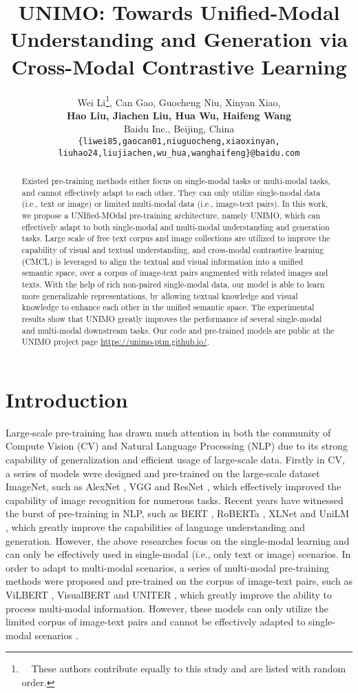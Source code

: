 \documentclass[11pt,a4paper]{article}
\title{UNIMO: Towards Unified-Modal Understanding and Generation via Cross-Modal Contrastive Learning}
\author{Wei Li\thanks{\ \ These authors contribute equally to this study and are listed with random order.}, Can Gao\footnotemark[1], Guocheng Niu\footnotemark[1],  Xinyan Xiao\footnotemark[1], \\ \textbf{Hao Liu, Jiachen Liu, Hua Wu, Haifeng Wang} \\
  Baidu Inc., Beijing, China \\
  \texttt{\{liwei85,gaocan01,niuguocheng,xiaoxinyan,} \\
  \texttt{liuhao24,liujiachen,wu\_hua,wanghaifeng\}@baidu.com}
  }
\date{}
\begin{document}
\maketitle
\begin{abstract}
Existed pre-training methods either focus on single-modal tasks or multi-modal tasks, and cannot effectively adapt to each other.
They can only utilize single-modal data (i.e., text or image) or limited multi-modal data (i.e., image-text pairs).
In this work, we propose a UNIfied-MOdal pre-training architecture, namely UNIMO, which can effectively adapt to both single-modal and multi-modal understanding and generation tasks.
Large scale of free text corpus and image collections are utilized to improve the capability of visual and textual understanding, and cross-modal contrastive learning (CMCL) is leveraged to align the textual and visual information into a unified semantic space, over a corpus of image-text pairs augmented with related images and texts.
With the help of rich non-paired single-modal data, our model is able to learn more generalizable representations, by allowing textual knowledge and visual knowledge to enhance each other in the unified semantic space.
The experimental results show that UNIMO greatly improves the performance of several single-modal and multi-modal downstream tasks.
Our code and pre-trained models are public at the UNIMO project page \url{https://unimo-ptm.github.io/}.

\end{abstract}



\section{Introduction}
\label{sec:intro}

Large-scale pre-training has drawn much attention in both the community of Compute Vision (CV) and Natural Language Processing (NLP) due to its strong capability of generalization and efficient usage of large-scale data.
Firstly in CV, a series of models were designed and pre-trained on the large-scale dataset ImageNet, such as AlexNet \citep{krizhevsky2017imagenet}, VGG \citep{simonyan2014very} and ResNet \citep{he2016deep}, which effectively improved the capability of image recognition for numerous tasks.
Recent years have witnessed the burst of pre-training in NLP, such as BERT \citep{devlin-etal-2019-bert}, RoBERTa \citep{liu2019roberta}, XLNet \citep{yang2019xlnet} and UniLM \citep{dong2019unified}, which greatly improve the capabilities of language understanding and generation.
However, the above researches focus on the single-modal learning and can only be effectively used in single-modal (i.e., only text or image) scenarios.
In order to adapt to multi-modal scenarios, a series of multi-modal pre-training methods were proposed and pre-trained on the corpus of image-text pairs, such as ViLBERT \citep{lu2019vilbert}, VisualBERT \citep{li2019visualbert} and UNITER \citep{chen2020uniter}, which greatly improve the ability to process multi-modal information.
However, these models can only utilize the limited corpus of image-text pairs and cannot be effectively adapted to single-modal scenarios \citep{lin2020interbert}.
\end{document}
